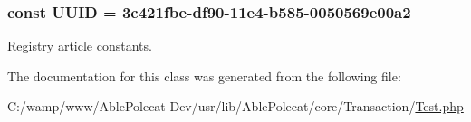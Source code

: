 \subsubsection[{U\+U\+I\+D}]{\setlength{\rightskip}{0pt plus 5cm}const U\+U\+I\+D = \textquotesingle{}3c421fbe-\/df90-\/11e4-\/b585-\/0050569e00a2\textquotesingle{}}\label{class_able_polecat___transaction___test_a74b892c8c0b86bf9d04c5819898c51e7}
Registry article constants. 

The documentation for this class was generated from the following file\+:\begin{DoxyCompactItemize}
\item 
C\+:/wamp/www/\+Able\+Polecat-\/\+Dev/usr/lib/\+Able\+Polecat/core/\+Transaction/\hyperlink{_transaction_2_test_8php}{Test.\+php}\end{DoxyCompactItemize}

